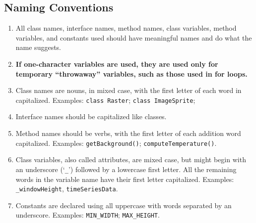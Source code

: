 \documentclass[a4paper,11pt]{report} %
\begin{document}
		\subsection*{Naming Conventions}\begin{enumerate}[resume]	
			\item All class names, interface names, method names, class variables, method variables, and constants used should have meaningful names and do what the name suggests.
			\item \textbf{If one-character variables are used, they are used only for temporary ``throwaway'' variables, such as those used in for loops.}\smallskip \\
%				
			\item Class names are nouns, in mixed case, with the first letter of each word in capitalized. Examples: \texttt{class Raster}; \texttt{class ImageSprite};
			\item Interface names should be capitalized like classes.
			\item Method names should be verbs, with the first letter of each addition word capitalized. Examples: \texttt{getBackground()}; \texttt{computeTemperature()}.
			\item Class variables, also called attributes, are mixed case, but might begin with an underscore (`\texttt{\_}') followed by a lowercase first letter. All the remaining words in the variable name have their first letter capitalized. Examples: \texttt{\_windowHeight}, \texttt{timeSeriesData}.
			\item Constants are declared using all uppercase with words separated by an underscore. Examples: \texttt{MIN\_WIDTH}; \texttt{MAX\_HEIGHT}.
		\end{enumerate}
		
\end{document}

